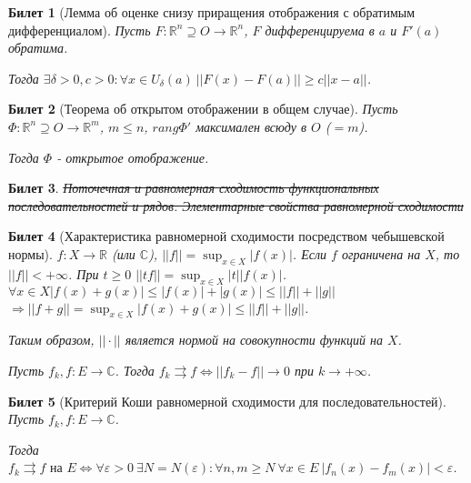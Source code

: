 \documentclass[11pt,a4paper,oneside]{scrartcl}
\newtheorem{ticket}{Билет}
\begin{document}
\addtocounter{ticket}{-1}
\begin{ticket}[Лемма об оценке снизу приращения отображения с обратимым дифференциалом]
    Пусть $F: \mathbb{R}^n \supseteq O \rightarrow \mathbb{R}^n$, $F$ дифференцируема в $a$
    и $F'(a)$ обратима.

    Тогда $\exists \delta > 0, c > 0 : \forall x \in U_\delta (a) \
    ||F(x) - F(a)|| \geq c||x-a||$.
\end{ticket}

\begin{ticket}[Теорема об открытом отображении в общем случае]
    Пусть $\Phi: \mathbb{R}^n \supseteq O \rightarrow \mathbb{R}^m$, $m \leq n$,
    $rang \Phi'$ максимален всюду в $O$ ($= m$).

    Тогда $\Phi$ - открытое отображение.
\end{ticket}

\setcounter{ticket}{25}
\addtocounter{ticket}{-1}
\begin{ticket}{\sout{Поточечная и равномерная сходимость функциональных последовательностей
    и рядов. Элементарные свойства равномерной сходимости}}
\end{ticket}

\addtocounter{ticket}{-1}
\begin{ticket}[Характеристика равномерной сходимости посредством чебышевской нормы]
    $f: X \rightarrow \mathbb{R}$ (или $\mathbb{C}$), $||f|| = \sup_{x \in X} |f(x)|$.
    Если $f$ ограничена на $X$, то $||f|| < +\infty$.
    При $t \geq 0$ $||tf|| = \sup_{x \in X} |t| |f(x)|$.
    $\forall x \in X |f(x)+g(x)| \leq |f(x)| + |g(x)| \leq ||f|| + ||g||$
    $\Rightarrow ||f+g|| = \sup_{x \in X} |f(x) + g(x)| \leq ||f|| + ||g||$.

    Таким образом, $||\cdot||$ является нормой на совокупности функций на $X$.

    Пусть $f_k, f: E \rightarrow \mathbb{C}$.
    Тогда $f_k \rightrightarrows f \Leftrightarrow ||f_k - f|| \rightarrow 0$
    при $k \rightarrow +\infty$.
\end{ticket}

\addtocounter{ticket}{-1}
\begin{ticket}[Критерий Коши равномерной сходимости для последовательностей]
    Пусть $f_k, f: E \rightarrow \mathbb{C}$.

    Тогда $f_k \rightrightarrows f \text{ на } E \Leftrightarrow
    \forall \varepsilon > 0 \ \exists N = N(\varepsilon) : \forall n, m \geq N \
    \forall x \in E \ |f_n(x) - f_m(x)| < \varepsilon$.
\end{ticket}
\end{document}

